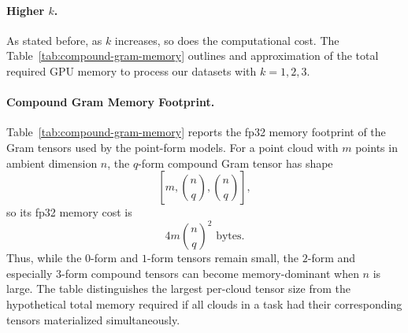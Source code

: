 \documentclass{article}
\theoremstyle{remark}
\theoremstyle{plain}
\begin{document}
\paragraph{Higher $k$.} As stated before, as $k$ increases, so does the computational cost. The Table~\ref{tab:compound-gram-memory} outlines and approximation of the total required GPU memory to process our datasets with $k={1,2,3}$.
\paragraph{Compound Gram Memory Footprint.}
Table~\ref{tab:compound-gram-memory} reports the fp32 memory footprint of the Gram tensors used by the point-form models. For a point cloud with $m$ points in ambient dimension $n$, the $q$-form compound Gram tensor has shape
\[
[m,\binom{n}{q},\binom{n}{q}],
\]
so its fp32 memory cost is
\[
4m\binom{n}{q}^2 \text{ bytes}.
\]
Thus, while the $0$-form and $1$-form tensors remain small, the $2$-form and especially $3$-form compound tensors can become memory-dominant when $n$ is large. The table distinguishes the largest per-cloud tensor size from the hypothetical total memory required if all clouds in a task had their corresponding tensors materialized simultaneously.
\end{document}
